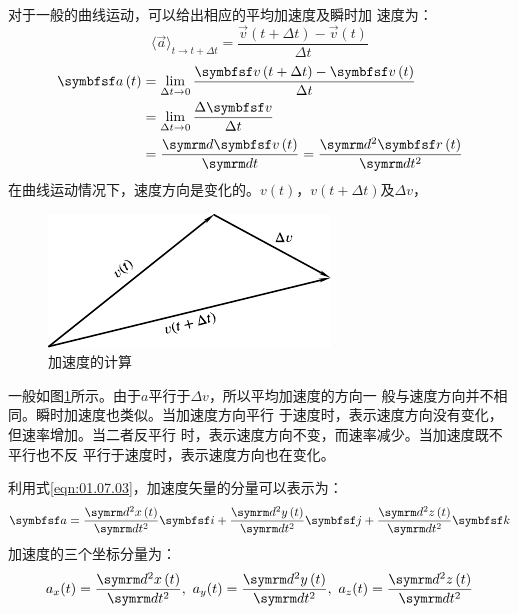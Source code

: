对于一般的曲线运动，可以给出相应的平均加速度及瞬时加
速度为：
\begin{equation}\label{eqn:01.08.02}
  \langle \vec{a} \rangle_{t \rightarrow t+\Delta t} = \frac{\vec{v}\left(t+\Delta t\right)-\vec{v}\left(t\right)}{\Delta t}
\end{equation}
\begin{equation}\label{eqn:01.08.03}
  \begin{aligned}
    \vec{a}\left(t\right) & =\lim _{\Delta t \rightarrow 0} \frac{\vec{v}\left(t+\Delta t\right)-\vec{v}\left(t\right)}{\Delta t} \\
                          & =\lim_{\Delta t \rightarrow 0}\frac{\Delta \vec{v}}{\Delta t}                                         \\
                          & =\frac{\dif\vec{v}\left(t\right)}{\dif t}=\frac{\dif^2 \vec{r}\left(t\right)}{\dif t^2}
  \end{aligned}
\end{equation}
在曲线运动情况下，速度方向是变化的。$v\left(t\right)$，$v\left(t+\Delta t\right)$及$\Delta v$，
\begin{figure}
  \centering
  \small
  \includegraphics{figure/fig01.14}
  \caption{加速度的计算}
  \label{fig:01.14}
\end{figure}
一般如图\ref{fig:01.14}所示。由于$a$平行于$\Delta v$，所以平均加速度的方向一
般与速度方向并不相同。瞬时加速度也类似。当加速度方向平行
于速度时，表示速度方向没有变化，但速率增加。当二者反平行
\clearpage\noindent
时，表示速度方向不变，而速率减少。当加速度既不平行也不反
平行于速度时，表示速度方向也在变化。

利用式\eqref{eqn:01.07.03}，加速度矢量的分量可以表示为：
\begin{equation}\label{eqn:01.08.04}
  \vec{a}=\frac{\dif^2x\left(t\right)}{\dif t^2}\vec{i}+\frac{\dif^2y\left(t\right)}{\dif t^2}\vec{j}+\frac{\dif^2z\left(t\right)}{\dif t^2}\vec{k}
\end{equation}
加速度的三个坐标分量为：
\setlength{\mathindent}{4em}
\begin{equation}\label{eqn:01.08.05}
  a_x(t)=\frac{\dif^2x\left(t\right)}{\dif t^2},~ a_y(t)=\frac{\dif^2y\left(t\right)}{\dif t^2},~
  a_z(t)=\frac{\dif^2z\left(t\right)}{\dif t^2}
\end{equation}
\setlength{\mathindent}{6em}

